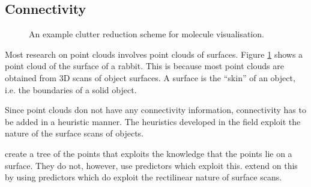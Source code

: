 \documentclass[a4paper,twocolumn]{article}
\begin{document}

\subsection{Connectivity}

\begin{figure}[!h]
\centering
{}
\caption{An example clutter reduction scheme for molecule visualisation.}
\label{fig:points}
\end{figure}

Most research on point clouds involves point clouds of surfaces. 
Figure \ref{fig:points} shows a point cloud of the surface of a rabbit. This is
because most point clouds are obtained from 3D scans of object surfaces. A
surface is the “skin” of an object, i.e. the boundaries of a solid
object.

Since point clouds don not have any connectivity information, connectivity has
to be added in a heuristic manner. The heuristics developed in the field
exploit the nature of the surface scans of objects.

\cite{gumholdcomp} create a tree of the points that exploits the knowledge
that the points lie on a surface. They do not, however, use predictors which
exploit this. \cite{merrycomp} extend on this by using predictors which do
exploit the rectilinear nature of surface scans.
\end{document}
